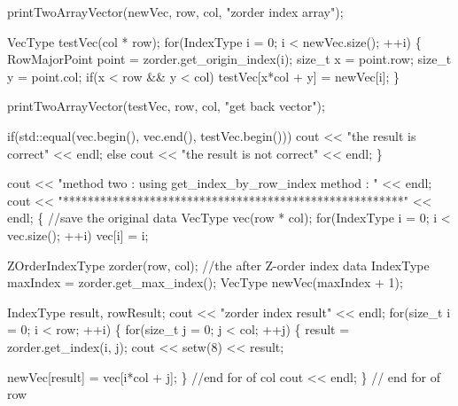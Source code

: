 \begin{DoxyCodeInclude}
                printTwoArrayVector(newVec, row, col, \textcolor{stringliteral}{"zorder index array"});

                VecType testVec(col * row);
                \textcolor{keywordflow}{for}(IndexType i = 0; i < newVec.size(); ++i) \{
                        RowMajorPoint point = zorder.get\_origin\_index(i);
                        \textcolor{keywordtype}{size\_t} x = point.row;
                        \textcolor{keywordtype}{size\_t} y = point.col;
                        \textcolor{keywordflow}{if}(x < row && y < col) testVec[x*col + y] = newVec[i];
                \}

                printTwoArrayVector(testVec, row, col, \textcolor{stringliteral}{"get back vector"});

                \textcolor{keywordflow}{if}(std::equal(vec.begin(), vec.end(), testVec.begin()))
                        cout << \textcolor{stringliteral}{"the result is correct"} << endl;
                \textcolor{keywordflow}{else}
                        cout << \textcolor{stringliteral}{"the result is not correct"} << endl;
        \}

        cout << \textcolor{stringliteral}{"method two : using get\_index\_by\_row\_index method : "} << endl;
        cout << \textcolor{stringliteral}{"*******************************************************"} << 
      endl;
        \{
                \textcolor{comment}{//save the original data}
                VecType vec(row * col);
                \textcolor{keywordflow}{for}(IndexType i = 0; i < vec.size(); ++i) vec[i] = i;

                ZOrderIndexType zorder(row, col);
                \textcolor{comment}{//the after Z-order index data}
                IndexType maxIndex = zorder.get\_max\_index();
                VecType newVec(maxIndex + 1);

                IndexType result, rowResult;
                cout << \textcolor{stringliteral}{"zorder index result"} << endl;
                \textcolor{keywordflow}{for}(\textcolor{keywordtype}{size\_t} i = 0; i < row; ++i) \{
                        \textcolor{keywordflow}{for}(\textcolor{keywordtype}{size\_t} j = 0; j < col; ++j) \{
                                result = zorder.get\_index(i, j);
                                cout << setw(8) << result;

                                newVec[result] = vec[i*col + j];
                        \} \textcolor{comment}{//end for of col}
                        cout << endl;
                \} \textcolor{comment}{// end for of row}


\end{DoxyCodeInclude}
